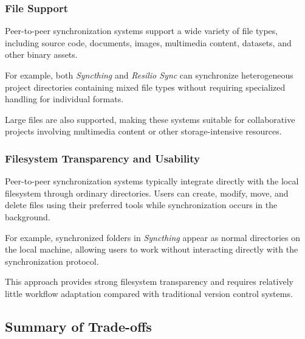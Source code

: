 \subsubsection{File Support}

Peer-to-peer synchronization systems support a wide variety of
file types, including source code, documents, images,
multimedia content, datasets, and other binary assets.

For example, both \textit{Syncthing} and \textit{Resilio Sync}
can synchronize heterogeneous project directories containing
mixed file types without requiring specialized handling for
individual formats.

Large files are also supported, making these systems suitable
for collaborative projects involving multimedia content or
other storage-intensive resources.

\subsubsection{Filesystem Transparency and Usability}

Peer-to-peer synchronization systems typically integrate
directly with the local filesystem through ordinary
directories. Users can create, modify, move, and delete files
using their preferred tools while synchronization occurs in
the background.

For example, synchronized folders in \textit{Syncthing}
appear as normal directories on the local machine, allowing
users to work without interacting directly with the
synchronization protocol.

This approach provides strong filesystem transparency and
requires relatively little workflow adaptation compared with
traditional version control systems.

\subsection{Summary of Trade-offs}


